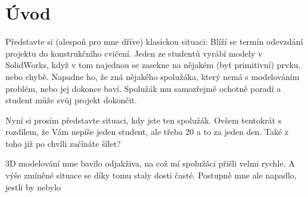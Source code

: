 \chapter*{Úvod}
Představte si (alespoň pro mne dříve) klasickou situaci: 
Blíží se termín odevzdání projektu do konstrukčního cvičení.
Jeden ze studentů vyrábí modely v SolidWorks, když v tom najednou se zasekne na nějakém (byť primitivní) prvku, nebo chybě.
Napadne ho, že zná nějakého spolužáka, který nemá s modelováním problém, nebo jej dokonce baví.
Spolužák mu samozřejmě ochotně poradí a student může svůj projekt dokončit.

Nyní si prosím představte situaci, kdy jste ten spolužák.
Ovšem tentokrát s rozdílem, že Vám nepíše jeden student, ale třeba 20 a to za jeden den.
Také z toho již po chvíli začínáte šílet?

3D modelování mne bavilo odjakživa, na což mí spolužáci přišli velmi rychle.
A výše zmíněné situace se díky tomu staly dosti časté.
Postupně mne ale napadlo, jestli by nebylo

\newpage

